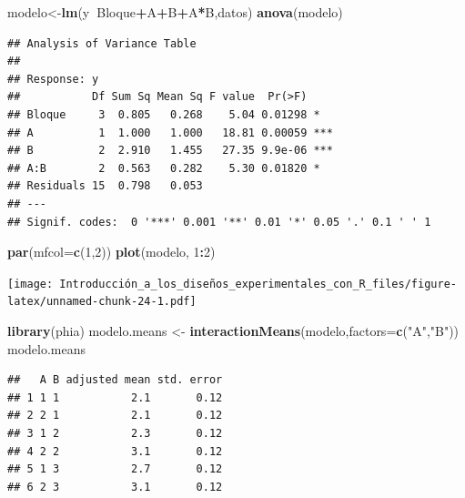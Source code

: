\documentclass[]{book}
\newenvironment{Shaded}{\begin{snugshade}}{\end{snugshade}}
\newcommand{\KeywordTok}[1]{\textcolor[rgb]{0.13,0.29,0.53}{\textbf{#1}}}
\newcommand{\DataTypeTok}[1]{\textcolor[rgb]{0.13,0.29,0.53}{#1}}
\newcommand{\DecValTok}[1]{\textcolor[rgb]{0.00,0.00,0.81}{#1}}
\newcommand{\StringTok}[1]{\textcolor[rgb]{0.31,0.60,0.02}{#1}}
\newcommand{\OperatorTok}[1]{\textcolor[rgb]{0.81,0.36,0.00}{\textbf{#1}}}
\newcommand{\NormalTok}[1]{#1}
\begin{document}
\begin{Shaded}
\begin{Highlighting}[]
\NormalTok{modelo<-}\KeywordTok{lm}\NormalTok{(y}\OperatorTok{~}\NormalTok{Bloque}\OperatorTok{+}\NormalTok{A}\OperatorTok{+}\NormalTok{B}\OperatorTok{+}\NormalTok{A}\OperatorTok{*}\NormalTok{B,datos)}
\KeywordTok{anova}\NormalTok{(modelo)}
\end{Highlighting}
\end{Shaded}

\begin{verbatim}
## Analysis of Variance Table
## 
## Response: y
##           Df Sum Sq Mean Sq F value  Pr(>F)    
## Bloque     3  0.805   0.268    5.04 0.01298 *  
## A          1  1.000   1.000   18.81 0.00059 ***
## B          2  2.910   1.455   27.35 9.9e-06 ***
## A:B        2  0.563   0.282    5.30 0.01820 *  
## Residuals 15  0.798   0.053                    
## ---
## Signif. codes:  0 '***' 0.001 '**' 0.01 '*' 0.05 '.' 0.1 ' ' 1
\end{verbatim}

\begin{Shaded}
\begin{Highlighting}[]
\KeywordTok{par}\NormalTok{(}\DataTypeTok{mfcol=}\KeywordTok{c}\NormalTok{(}\DecValTok{1}\NormalTok{,}\DecValTok{2}\NormalTok{))}
\KeywordTok{plot}\NormalTok{(modelo, }\DecValTok{1}\OperatorTok{:}\DecValTok{2}\NormalTok{)}
\end{Highlighting}
\end{Shaded}

\texttt{[image: Introducción\_a\_los\_diseños\_experimentales\_con\_R\_files/figure-latex/unnamed-chunk-24-1.pdf]}

\begin{Shaded}
\begin{Highlighting}[]
\KeywordTok{library}\NormalTok{(phia)}
\NormalTok{modelo.means <-}\StringTok{ }\KeywordTok{interactionMeans}\NormalTok{(modelo,}\DataTypeTok{factors=}\KeywordTok{c}\NormalTok{(}\StringTok{"A"}\NormalTok{,}\StringTok{"B"}\NormalTok{))}
\NormalTok{modelo.means}
\end{Highlighting}
\end{Shaded}

\begin{verbatim}
##   A B adjusted mean std. error
## 1 1 1           2.1       0.12
## 2 2 1           2.1       0.12
## 3 1 2           2.3       0.12
## 4 2 2           3.1       0.12
## 5 1 3           2.7       0.12
## 6 2 3           3.1       0.12
\end{verbatim}
\end{document}
